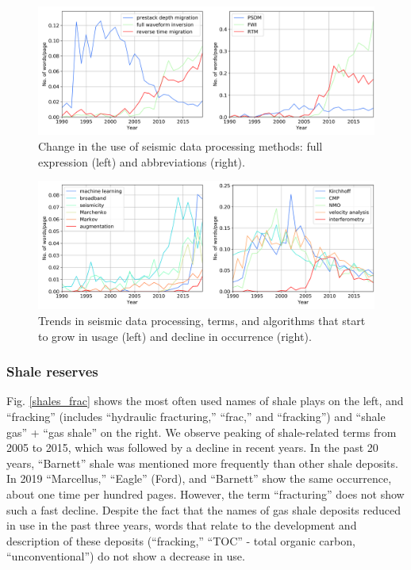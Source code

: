\documentclass[geosciences,article,submit,moreauthors,pdftex]{Definitions/mdpi}
\begin{document}
\begin{figure}[ht!]

\includegraphics[width=\textwidth]{fwi_rtm_psdm_both.png} 
\caption{Change in the use of seismic data processing methods: full expression (left) and abbreviations (right).}
\label{fwi_psdm}
\end{figure}

\begin{figure}[ht!]

\includegraphics[width=\textwidth]{proc_meth.png} 
\caption{Trends in seismic data processing, terms, and algorithms that start to grow in usage (left) and decline in occurrence (right).}
\label{proc_meth}
\end{figure}




\subsubsection{Shale reserves} 
Fig. \ref{shales_frac} shows the most often used names of shale plays on the left, and ``fracking'' (includes ``hydraulic fracturing,'' ``frac,'' and ``fracking'') and ``shale gas'' + ``gas shale'' on the right. We observe peaking of shale-related terms from 2005 to 2015, which was followed by a decline in recent years. In the past 20 years, ``Barnett'' shale was mentioned more frequently than other shale deposits. In 2019 ``Marcellus,'' ``Eagle'' (Ford), and ``Barnett'' show the same occurrence, about one time per hundred pages. However, the term ``fracturing'' does not show such a fast decline. Despite the fact that the names of gas shale deposits reduced in use in the past three years, words that relate to the development and description of these deposits (``fracking,'' ``TOC'' - total organic carbon, ``unconventional'') do not show a decrease in use.
\end{document}
